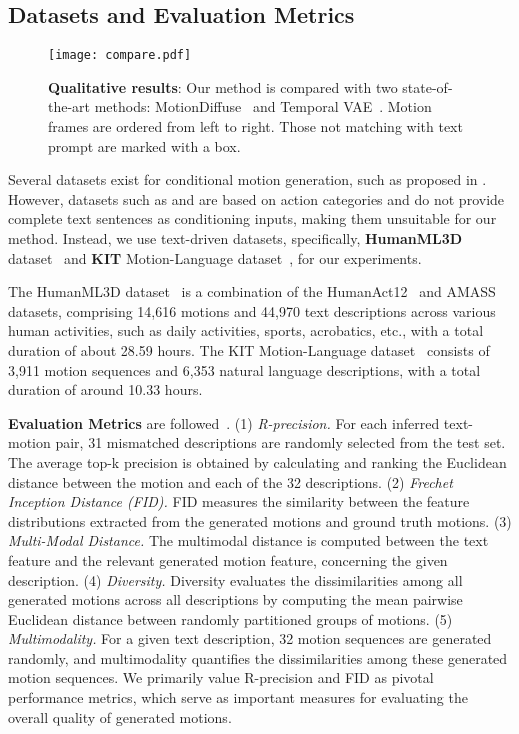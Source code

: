 \documentclass[10pt,twocolumn,letterpaper]{article}
\begin{document}
\subsection{Datasets and Evaluation Metrics}
\label{sec:Datasets and Evaluation Metrics}

\begin{figure*}[t]
    \centering
     \texttt{[image: compare.pdf]}
    \caption{\textbf{Qualitative results}: Our method is compared with two state-of-the-art methods: MotionDiffuse~\cite{zhang2022motiondiffuse} and Temporal VAE~\cite{guo2022generating}. Motion frames are ordered from left to right. Those not matching with text prompt are marked with a box.}
    \label{fig:compare}
\end{figure*}




Several datasets exist for conditional motion generation, such as proposed in \cite{guo2022generating,guo2020action2motion,ji2018large,plappert2016kit}. However, datasets such as \cite{guo2020action2motion} and \cite{ji2018large} are based on action categories and do not provide complete text sentences as conditioning inputs, making them unsuitable for our method. Instead, we use text-driven datasets, 
specifically, \textbf{HumanML3D} dataset~\cite{guo2022generating} and \textbf{KIT} Motion-Language dataset~\cite{plappert2016kit}, for our experiments.


The HumanML3D dataset~\cite{guo2022generating} is a combination of the HumanAct12~\cite{guo2020action2motion} and AMASS~\cite{mahmood2019amass} datasets, comprising 14,616 motions and 44,970 text descriptions across various human activities, such as daily activities, sports, acrobatics, etc., with a total duration of about 28.59 hours. The KIT Motion-Language dataset~\cite{plappert2016kit} consists of 3,911 motion sequences and 6,353 natural language descriptions, with a total duration of around 10.33 hours.


\textbf{Evaluation Metrics} are followed~\cite{guo2022generating}. (1) \textit{R-precision.} For each inferred text-motion pair, 31 mismatched descriptions are randomly selected from the test set. The average top-k precision is obtained by calculating and ranking the Euclidean distance between the motion and each of the 32 descriptions. (2) \textit{Frechet Inception Distance (FID).} FID measures the similarity between the feature distributions extracted from the generated motions and ground truth motions. (3) \textit{Multi-Modal Distance.} The multimodal distance is computed between the text feature and the relevant generated motion feature, concerning the given description. (4) \textit{Diversity.} Diversity evaluates the dissimilarities among all generated motions across all descriptions by computing the mean pairwise Euclidean distance between randomly partitioned groups of motions. (5) \textit{Multimodality.} For a given text description, 32 motion sequences are generated randomly, and multimodality quantifies the dissimilarities among these generated motion sequences. We primarily value R-precision and FID as pivotal performance metrics, which serve as important measures for evaluating the overall quality of generated motions.
\end{document}
